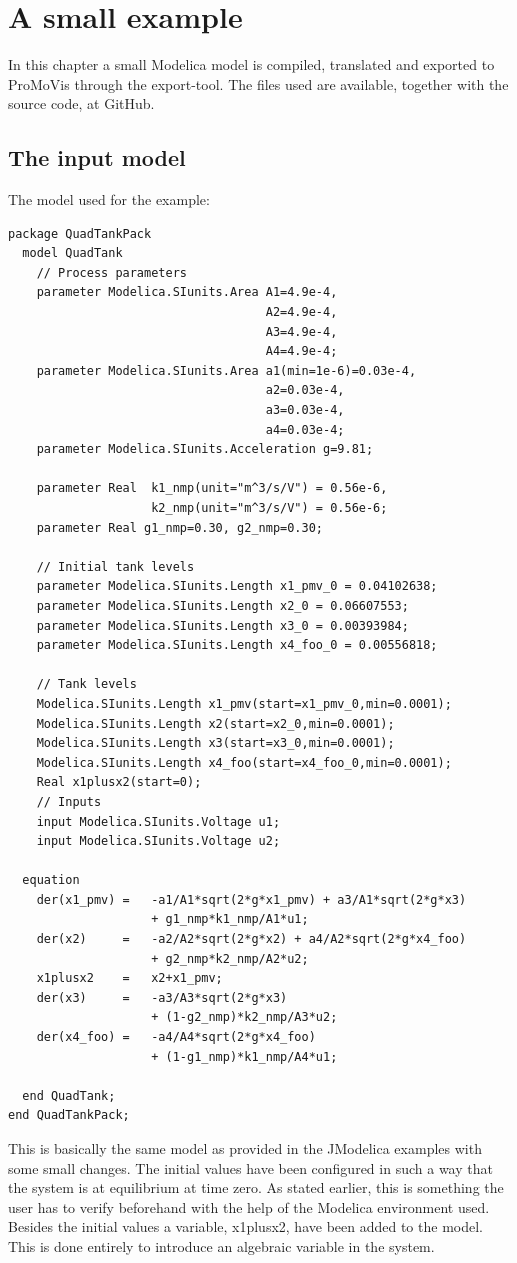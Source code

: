 \section{A small example}
In this chapter a small Modelica model is compiled, translated and exported to ProMoVis through the export-tool. The files used are available, together with the source code, at GitHub\cite{githabb}\nocite{*}.

\subsection{The input model}

The model used for the example:
\lstset{language=modelica}
\begin{lstlisting}
package QuadTankPack
  model QuadTank
    // Process parameters
	parameter Modelica.SIunits.Area A1=4.9e-4, 
									A2=4.9e-4, 
									A3=4.9e-4, 
									A4=4.9e-4;
	parameter Modelica.SIunits.Area a1(min=1e-6)=0.03e-4, 
									a2=0.03e-4, 
									a3=0.03e-4, 
									a4=0.03e-4;
	parameter Modelica.SIunits.Acceleration g=9.81;
	
	parameter Real 	k1_nmp(unit="m^3/s/V") = 0.56e-6, 
					k2_nmp(unit="m^3/s/V") = 0.56e-6;
	parameter Real g1_nmp=0.30, g2_nmp=0.30;

    // Initial tank levels
	parameter Modelica.SIunits.Length x1_pmv_0 = 0.04102638;
	parameter Modelica.SIunits.Length x2_0 = 0.06607553;
	parameter Modelica.SIunits.Length x3_0 = 0.00393984;
	parameter Modelica.SIunits.Length x4_foo_0 = 0.00556818;
	
    // Tank levels
	Modelica.SIunits.Length x1_pmv(start=x1_pmv_0,min=0.0001);
	Modelica.SIunits.Length x2(start=x2_0,min=0.0001);
	Modelica.SIunits.Length x3(start=x3_0,min=0.0001);
	Modelica.SIunits.Length x4_foo(start=x4_foo_0,min=0.0001);
	Real x1plusx2(start=0);
	// Inputs
	input Modelica.SIunits.Voltage u1;
	input Modelica.SIunits.Voltage u2;

  equation    
    der(x1_pmv) = 	-a1/A1*sqrt(2*g*x1_pmv) + a3/A1*sqrt(2*g*x3) 
					+ g1_nmp*k1_nmp/A1*u1;						
	der(x2) 	= 	-a2/A2*sqrt(2*g*x2) + a4/A2*sqrt(2*g*x4_foo)
					+ g2_nmp*k2_nmp/A2*u2;
	x1plusx2	=	x2+x1_pmv;
	der(x3) 	= 	-a3/A3*sqrt(2*g*x3) 
					+ (1-g2_nmp)*k2_nmp/A3*u2;
	der(x4_foo) = 	-a4/A4*sqrt(2*g*x4_foo) 
					+ (1-g1_nmp)*k1_nmp/A4*u1;

  end QuadTank;
end QuadTankPack;
\end{lstlisting}
This is basically the same model as provided in the JModelica examples with some small changes. The initial values have been configured in such a way that the system is at equilibrium at time zero. As stated earlier, this is something the user has to verify beforehand with the help of the Modelica environment used. Besides the initial values a variable, x1plusx2, have been added to the model. This is done entirely to introduce an algebraic variable in the system.
